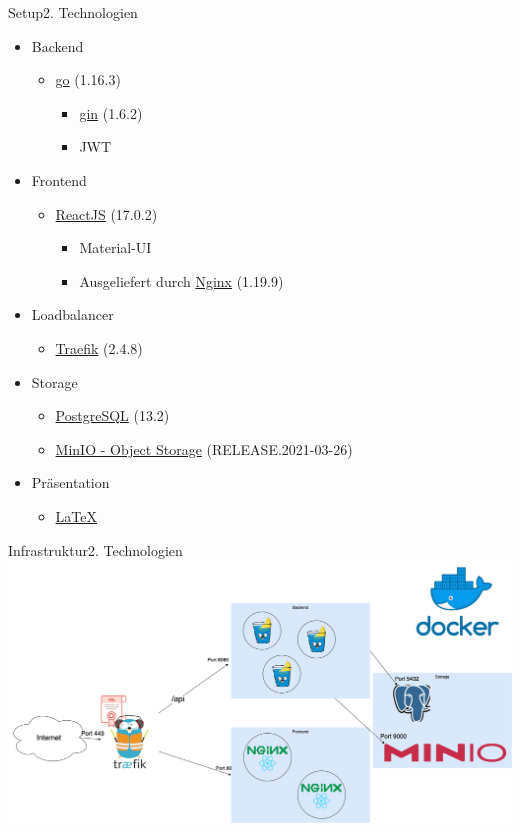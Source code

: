 \documentclass[aspectratio=169,20pt]{beamer}
\begin{document}
\begin{frame}{Setup}{2. Technologien}
	\begin{itemize}
		\item{Backend}
		\begin{itemize}
			\item{\href{https://golang.org/}{go} (1.16.3)}
			\begin{itemize}
				\item{\href{https://gin-gonic.com/}{gin} (1.6.2)}
				\item{JWT}
			\end{itemize}
		\end{itemize}
		\item{Frontend}
		\begin{itemize}
			\item{\href{https://reactjs.org/versions/}{ReactJS} (17.0.2)}
			\begin{itemize}
				\item{Material-UI}
				\item{Ausgeliefert durch \href{https://nginx.org/}{Nginx} (1.19.9)}
			\end{itemize}
		\end{itemize}
		\item{Loadbalancer}
		       
		\begin{itemize}
			\item{\href{https://traefik.io/}{Traefik} (2.4.8)}
		\end{itemize} 
		\item{Storage}
		\begin{itemize}
			\item{\href{https://www.postgresql.org/}{PostgreSQL} (13.2)}
			\item{\href{https://min.io/}{MinIO - Object Storage} (RELEASE.2021-03-26)}
		\end{itemize}
		\item{Präsentation}
		\begin{itemize}
			\item{\href{https://github.com/ost-fh/Latex-Beamer-Theme}{LaTeX}}
		\end{itemize}       
	\end{itemize}
		
\end{frame}




\begin{frame}{Infrastruktur}{2. Technologien}
	\includegraphics[scale=0.45]{Infrastruktur}	
\end{frame}
\end{document}
